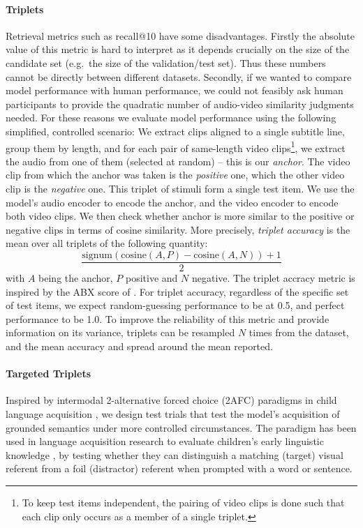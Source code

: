 \paragraph{Triplets}
Retrieval metrics such as recall@10 have some disadvantages. Firstly
the absolute value of this metric is hard to interpret as it depends
crucially on the size of the candidate set (e.g.\ the size of the
validation/test set). Thus these numbers cannot be directly between
different datasets. Secondly, if
we wanted to compare model performance with human performance, we
could not feasibly ask human participants to provide the quadratic
number of audio-video similarity judgments needed. For these reasons
we evaluate model performance using the following simplified,
controlled scenario: We extract clips aligned to a single subtitle
line, group them by length, and for each pair of same-length video
clips\footnote{To keep test items independent, the pairing of video
  clips is done such that each clip only occurs as a member of a single
  triplet.}, we extract the audio from one of them (selected at
random) -- this is our {\it anchor}. The video clip from which the
anchor was taken is the {\it positive} one, which the other video clip
is the {\it negative} one. This triplet of stimuli form a single test
item.  We use the model's audio encoder to encode the anchor, and the
video encoder to encode both video clips. We then check whether anchor
is more similar to the positive or negative clips in terms of cosine
similarity.  More precisely, {\it triplet accuracy} is the mean over
all triplets of the following quantity:
\begin{equation}
  \frac{\mathrm{signum}(\mathrm{cosine}(A, P) - \mathrm{cosine}(A, N)) + 1}{2}
  \label{eq:triplet-acc}
\end{equation}
with $A$ being the anchor, $P$ positive and $N$ negative. The triplet
accracy metric is inspired by the ABX score of \citet{schatz2016abx}.
For triplet accuracy, regardless of the specific set of test items, we
expect random-guessing performance to be at 0.5, and perfect
performance to be 1.0.  To improve the reliability of this metric and
provide information on its variance, triplets can be resampled $N$
times from the dataset, and the mean accuracy and spread around the mean
reported.

\paragraph{Targeted Triplets}
Inspired by intermodal 2-alternative forced choice (2AFC) paradigms in child
language acquisition \citep{hirsh1996intermodal},
we design test trials that test the model's acquisition of grounded
semantics under more controlled circumstances.
The paradigm has been used in language acquisition research to evaluate children's early linguistic knowledge \citep[e.g.,][]{noble2011comprehension,bergelson20126}, by testing whether they can distinguish a matching (target) visual referent from a foil (distractor) referent when prompted with a word or sentence.


